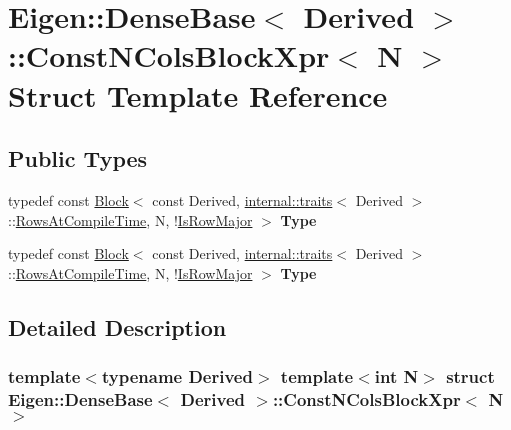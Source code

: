 \hypertarget{struct_eigen_1_1_dense_base_1_1_const_n_cols_block_xpr}{}\section{Eigen\+:\+:Dense\+Base$<$ Derived $>$\+:\+:Const\+N\+Cols\+Block\+Xpr$<$ N $>$ Struct Template Reference}
\label{struct_eigen_1_1_dense_base_1_1_const_n_cols_block_xpr}
\subsection*{Public Types}
\begin{DoxyCompactItemize}
\item 
\mbox{\label{struct_eigen_1_1_dense_base_1_1_const_n_cols_block_xpr_a73b934e0c38b490e5e639189d81b6266}} 
typedef const \hyperlink{group___core___module_class_eigen_1_1_block}{Block}$<$ const Derived, \hyperlink{struct_eigen_1_1internal_1_1traits}{internal\+::traits}$<$ Derived $>$\+::\hyperlink{group___core___module_a9784b8701c2d1c79fa8000e1b3ebdb8ba41d81bf4037b4d74c03b1242d8c133c0}{Rows\+At\+Compile\+Time}, N, !\hyperlink{group___core___module_a9784b8701c2d1c79fa8000e1b3ebdb8baff2add9b7e8426ba05be33f32806d21c}{Is\+Row\+Major} $>$ {\bfseries Type}
\item 
\mbox{\label{struct_eigen_1_1_dense_base_1_1_const_n_cols_block_xpr_a73b934e0c38b490e5e639189d81b6266}} 
typedef const \hyperlink{group___core___module_class_eigen_1_1_block}{Block}$<$ const Derived, \hyperlink{struct_eigen_1_1internal_1_1traits}{internal\+::traits}$<$ Derived $>$\+::\hyperlink{group___core___module_a9784b8701c2d1c79fa8000e1b3ebdb8ba41d81bf4037b4d74c03b1242d8c133c0}{Rows\+At\+Compile\+Time}, N, !\hyperlink{group___core___module_a9784b8701c2d1c79fa8000e1b3ebdb8baff2add9b7e8426ba05be33f32806d21c}{Is\+Row\+Major} $>$ {\bfseries Type}
\end{DoxyCompactItemize}


\subsection{Detailed Description}
\subsubsection*{template$<$typename Derived$>$\newline
template$<$int N$>$\newline
struct Eigen\+::\+Dense\+Base$<$ Derived $>$\+::\+Const\+N\+Cols\+Block\+Xpr$<$ N $>$}




